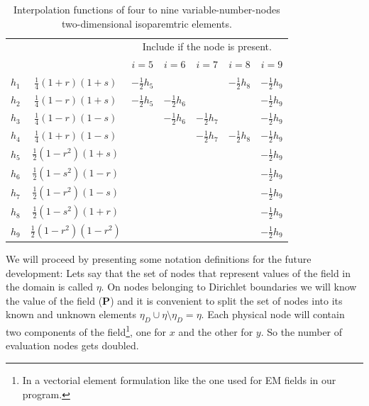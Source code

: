 \begin{center}
\begin{table}
\centering
    \begin{tabular}{r|c|c|c|c|c|c|}
       \multicolumn{2}{c}{~} & \multicolumn{5}{c}{Include if the node is present.}\\
       \multicolumn{1}{c}{~} & \multicolumn{1}{c|}{~} & $i=5$ & $i=6$ & $i=7$ & $i=8$ & $i=9$ \\      
    $h_1$ & $\frac{1}{4}\left(1+r\right)\left(1+s\right)$    & $-\frac{1}{2}h_5$ & ~     & ~ & $-\frac{1}{2}h_8$ & $-\frac{1}{2}h_9$ \\
    $h_2$ & $\frac{1}{4}\left(1-r\right)\left(1+s\right)$    & $-\frac{1}{2}h_5$ & $-\frac{1}{2}h_6$     &  &  & $-\frac{1}{2}h_9$ \\
    $h_3$ & $\frac{1}{4}\left(1-r\right)\left(1-s\right)$    &     & $-\frac{1}{2}h_6$ & $-\frac{1}{2}h_7$ &  & $-\frac{1}{2}h_9$ \\
    $h_4$ & $\frac{1}{4}\left(1+r\right)\left(1-s\right)$    &      &      & $-\frac{1}{2}h_7$ & $-\frac{1}{2}h_8$ & $-\frac{1}{2}h_9$ \\
    $h_5$ & $\frac{1}{2}\left(1-r^2\right)\left(1+s\right)$  &  & & &  & $-\frac{1}{2}h_9$ \\
    $h_6$ & $\frac{1}{2}\left(1-s^2\right)\left(1-r\right)$  & & &  &  & $-\frac{1}{2}h_9$ \\
    $h_7$ & $\frac{1}{2}\left(1-r^2\right)\left(1-s\right)$  & & & & &$-\frac{1}{2}h_9$ \\
    $h_8$ & $\frac{1}{2}\left(1-s^2\right)\left(1+r\right)$  & & & & & $-\frac{1}{2}h_9$ \\
    $h_9$ & $\frac{1}{2}\left(1-r^2\right)\left(1-r^2\right)$& & & & & $-\frac{1}{2}h_9$\\
    \end{tabular}
\caption{Interpolation functions of four to nine variable-number-nodes two-dimensional isoparemtric elements.}
\label{tab:int_funct}
\end{table}
\end{center}
We will proceed by presenting some notation definitions for the future development:
Lets say that the set of nodes that represent values of the field in the domain is called $\eta$. On nodes belonging to Dirichlet boundaries we will know the value of the field ($\mathbf{P}$) and it is convenient to split the set of nodes into its known and unknown elements $\eta_D\cup\eta\setminus\eta_D=\eta$.  Each physical node will contain two components of the field\footnote{In a vectorial element formulation like the one used for EM fields in our program.}, one for $x$ and the other for $y$. So the number of evaluation nodes gets doubled.

